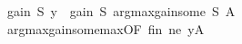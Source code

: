 \begin{isabellebody}
\ {\isachardoublequoteopen}gain\ S\ y\ {\isasymle}\ gain\ S\ {\isacharparenleft}{\kern0pt}argmax{\isacharunderscore}{\kern0pt}gain{\isacharunderscore}{\kern0pt}some\ S\ A{\isacharparenright}{\kern0pt}{\isachardoublequoteclose}\isanewline
\ \ \ \ \ \ \isamarkupfalse%
\ argmax{\isacharunderscore}{\kern0pt}gain{\isacharunderscore}{\kern0pt}some{\isacharunderscore}{\kern0pt}max{\isacharbrackleft}{\kern0pt}OF\ fin\ ne\ yA{\isacharbrackright}{\kern0pt}\ \isakeywordONE{{\isachardot}{\kern0pt}}\isamarkupfalse%
\isanewline
\ \ \isamarkupfalse%
\isanewline
{}\isamarkupfalse%
%
\endisatagproof
{\isafoldproof}%
%
\isadelimproof
\isanewline
%
\endisadelimproof
\isanewline
{}\isamarkupfalse%
\isanewline
%
\isadelimtheory
\isanewline
%
\endisadelimtheory
%
\isatagtheory
{}\isamarkupfalse%
%
\endisatagtheory
{\isafoldtheory}%
%
\isadelimtheory
%
\endisadelimtheory
%
\end{isabellebody}%
\endinput
